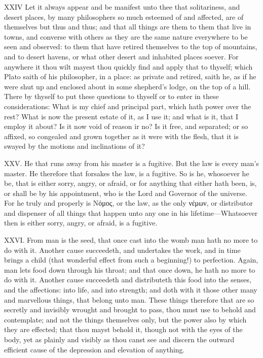 XXIV Let it always appear and be manifest unto thee that solitariness,
and desert places, by many philosophers so much esteemed of and affected,
are of themselves but thus and thus; and that all things are them to them
that live in towns, and converse with others as they are the same nature
everywhere to be seen and observed: to them that have retired themselves
to the top of mountains, and to desert havens, or what other desert and
inhabited places soever. For anywhere it thou wilt mayest thou quickly
find and apply that to thyself; which Plato saith of his philosopher, in a
place: as private and retired, saith he, as if he were shut up and
enclosed about in some shepherd's lodge, on the top of a hill. There by
thyself to put these questions to thyself or to enter in these
considerations: What is my chief and principal part, which hath power over
the rest? What is now the present estate of it, as I use it; and what is
it, that I employ it about? Is it now void of reason ir no? Is it free,
and separated; or so affixed, so congealed and grown together as it were
with the flesh, that it is swayed by the motions and inclinations of it?

XXV. He that runs away from his master is a fugitive. But the law is
every man's master. He therefore that forsakes the law, is a fugitive. So
is he, whosoever he be, that is either sorry, angry, or afraid, or for
anything that either hath been, is, or shall be by his appointment, who
is the Lord and Governor of the universe. For he truly and properly is
Νόμος, or the law, as the only
νέμων, or distributor and dispenser of all
things that happen unto any one in his lifetime—Whatsoever then is
either sorry, angry, or afraid, is a fugitive.

XXVI. From man is the seed, that once cast into the womb man hath no
more to do with it. Another cause succeedeth, and undertakes the work, and
in time brings a child (that wonderful effect from such a beginning!) to
perfection. Again, man lets food down through his throat; and that once
down, he hath no more to do with it. Another cause succeedeth and
distributeth this food into the senses, and the affections: into life, and
into strength; and doth with it those other many and marvellous things,
that belong unto man. These things therefore that are so secretly and
invisibly wrought and brought to pass, thou must use to behold and
contemplate; and not the things themselves only, but the power also by
which they are effected; that thou mayst behold it, though not with the
eyes of the body, yet as plainly and visibly as thou canst see and discern
the outward efficient cause of the depression and elevation of anything.


